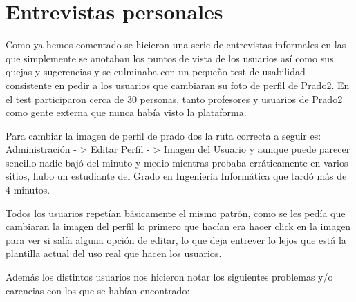 \section{Entrevistas personales}

Como ya hemos comentado se hicieron una serie de entrevistas informales en las que simplemente se anotaban los puntos de vista de los usuarios así como sus quejas y sugerencias y se culminaba con un pequeño test de usabilidad consistente en pedir a los usuarios que cambiaran su foto de perfil de Prado2. En el test participaron cerca de 30 personas, tanto profesores y usuarios de Prado2 como gente externa que nunca había visto la plataforma.

\bigskip
Para cambiar la imagen de perfil de prado dos la ruta correcta a seguir es: Administración - > Editar Perfil - > Imagen del Usuario y aunque puede parecer sencillo nadie bajó del minuto y medio mientras probaba erráticamente en varios sitios, hubo un estudiante del Grado en Ingeniería Informática que tardó más de 4 minutos.

\bigskip
Todos los usuarios repetían básicamente el mismo patrón, como se les pedía que cambiaran la imagen del perfil lo primero que hacían era hacer click en la imagen para ver si salía alguna opción de editar, lo que deja entrever lo lejos que está la plantilla actual del uso real que hacen los usuarios. 

\bigskip
Además los distintos usuarios nos hicieron notar los siguientes problemas y/o carencias con los que se habían encontrado:

